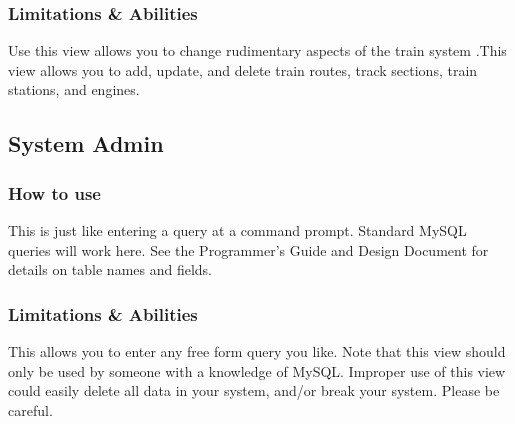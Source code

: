 \documentclass[letter]{article}
\begin{document}
\subsubsection{Limitations \& Abilities}
Use this view allows you to change rudimentary aspects of the train system .This view allows you to add, update, and delete train routes, track sections, train stations, and engines.


\subsection{System Admin}
\subsubsection{How to use}
This is just like entering a query at a command prompt. Standard MySQL queries will work here. See the Programmer's Guide and Design Document for details on table names and fields.

\subsubsection{Limitations \& Abilities}
This allows you to enter any free form query you like. Note that this view should only be used by someone with a knowledge of MySQL. Improper use of this view could easily delete all data in your system, and/or break your system. Please be careful.


\end{document}
